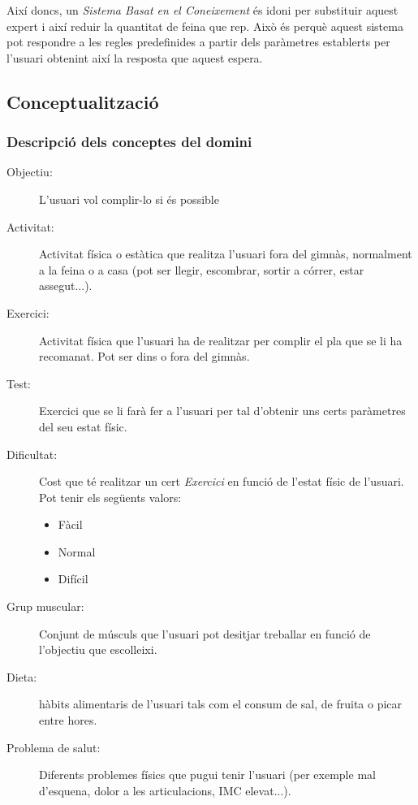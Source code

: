 \documentclass[a4paper, 12pt]{article}
\begin{document}
Així doncs, un \emph{Sistema Basat en el Coneixement} és idoni per substituir aquest expert i així reduir la quantitat de feina que rep. Això és perquè aquest sistema pot respondre a les regles predefinides a partir dels paràmetres establerts per l'usuari obtenint així la resposta que aquest espera.

\subsection{Conceptualització}

\subsubsection{Descripció dels conceptes del domini} 

\begin{description}
	\item[Objectiu:]  L'usuari vol complir-lo si és possible
	\item[Activitat:] Activitat física o estàtica que realitza l'usuari fora del gimnàs, normalment a la feina o a casa (pot ser llegir, escombrar, sortir a córrer, estar assegut...).
	\item[Exercici:]  Activitat física que l'usuari ha de realitzar per complir el pla que se li ha recomanat. Pot ser dins o fora del gimnàs.
	\item[Test:] Exercici que se li farà fer a l'usuari per tal d'obtenir uns certs paràmetres del seu estat físic.
	\item[Dificultat:] Cost que té realitzar un cert \emph{Exercici} en funció de l'estat físic de l'usuari. Pot tenir els següents valors:
	\begin{itemize}
		\item Fàcil
		\item Normal
		\item Difícil
	\end{itemize}
	\item[Grup muscular:] Conjunt de músculs que l'usuari pot desitjar treballar en funció de l'objectiu que escolleixi.
	\item[Dieta:] hàbits alimentaris de l'usuari tals com el consum de sal, de fruita o picar entre hores.
	\item[Problema de salut:] Diferents problemes físics que pugui tenir l'usuari (per exemple mal d'esquena, dolor a les articulacions, IMC elevat...).
	
\end{description}
\end{document}
